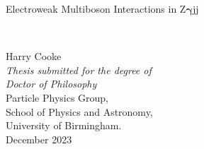 \documentclass[a4paper,twoside,12pt]{report}
\newcommand{\thesistitle}{Electroweak Multiboson Interactions in Z$\boldsymbol{\gamma}$jj} %
\newcommand{\thesisauthor}{Harry Cooke} %
\newcommand{\thesiscrest}{UoB_logo}
\begin{document}
\begin{titlepage}
  \begin{center}
    \parbox{14cm}{
      \centering
      \fontsize{29}{31}\selectfont \thesistitle
    }\\
    \vspace{1.2cm}
  \end{center}
  \begin{center}
  \end{center}
  \begin{center}
    \vspace{0.3cm}
    {\fontsize{20}{22}\selectfont \thesisauthor}\\
    \vspace{1.0cm}
    {\large\em Thesis submitted for the degree of}\\[.1em]
    {\large\em Doctor of Philosophy}\\
    \vspace{1.5cm}
    Particle Physics Group, \\
    School of Physics and Astronomy, \\
    University of Birmingham. \\
    \vspace{1cm}
    \fontsize{14}{16}\selectfont December 2023 \\
  \end{center}
\end{titlepage}

\thispagestyle{empty}%
~
\newpage
\thispagestyle{empty}%
~
\newpage

\end{document}
